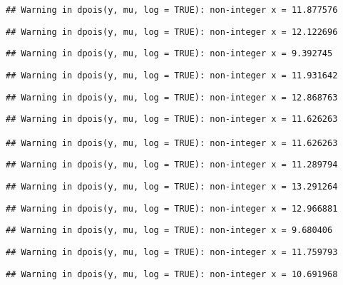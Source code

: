 \documentclass[
]{article}
\begin{document}
\begin{verbatim}
## Warning in dpois(y, mu, log = TRUE): non-integer x = 11.877576
\end{verbatim}

\begin{verbatim}
## Warning in dpois(y, mu, log = TRUE): non-integer x = 12.122696
\end{verbatim}

\begin{verbatim}
## Warning in dpois(y, mu, log = TRUE): non-integer x = 9.392745
\end{verbatim}

\begin{verbatim}
## Warning in dpois(y, mu, log = TRUE): non-integer x = 11.931642
\end{verbatim}

\begin{verbatim}
## Warning in dpois(y, mu, log = TRUE): non-integer x = 12.868763
\end{verbatim}

\begin{verbatim}
## Warning in dpois(y, mu, log = TRUE): non-integer x = 11.626263

## Warning in dpois(y, mu, log = TRUE): non-integer x = 11.626263
\end{verbatim}

\begin{verbatim}
## Warning in dpois(y, mu, log = TRUE): non-integer x = 11.289794
\end{verbatim}

\begin{verbatim}
## Warning in dpois(y, mu, log = TRUE): non-integer x = 13.291264
\end{verbatim}

\begin{verbatim}
## Warning in dpois(y, mu, log = TRUE): non-integer x = 12.966881
\end{verbatim}

\begin{verbatim}
## Warning in dpois(y, mu, log = TRUE): non-integer x = 9.680406
\end{verbatim}

\begin{verbatim}
## Warning in dpois(y, mu, log = TRUE): non-integer x = 11.759793
\end{verbatim}

\begin{verbatim}
## Warning in dpois(y, mu, log = TRUE): non-integer x = 10.691968
\end{verbatim}
\end{document}
